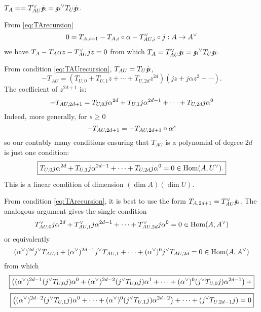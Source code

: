 { {\em $T_A = = T_{AU}^\vee \mathord{j\mkern-7mu\alpha} = \mathord{j\mkern-7mu\alpha}^\vee T_U \mathord{j\mkern-7mu\alpha}$.}

\bpf From \eqref{eq:TArecursion}
$$
0 = T_{A, i+1} - T_{A,i} \circ \alpha - T_{AU,i}^\vee \circ j : A \rightarrow A^\vee$$
we have
$T_A - T_A \alpha z - T_{AU}^\vee j z = 0$ from which $T_A = T_{AU}^\vee \mathord{j\mkern-7mu\alpha} = \mathord{j\mkern-7mu\alpha}^\vee T_U \mathord{j\mkern-7mu\alpha}$. \epf


From condition \eqref{eq:TAUrecursion}, $T_{AU} = T_U \mathord{j\mkern-7mu\alpha}$,
$$
-T_{AU} = \left( T_{U,0} + T_{U,1} z + \cdots + T_{U,2d} z^{2d} \right) \left( jz + j \alpha z ^2 + \cdots \right).$$
The coefficient of $z^{2d+1}$ is:
$$
-T_{AU,2d+1}=T_{U,0} j \alpha^{2d} + T_{U,1} j \alpha^{2d-1} + \cdots + T_{U,2d} j \alpha^0
$$
Indeed, more generally, for $s \geq 0$
$$
-T_{AU,2d+1}=-T_{AU,2d+1} \circ \alpha^s
$$
so our contably many conditions ensuring that $T_{AU}$ is a polynomial of degree $2d$ is just one condition:
\begin{equation}\label{eq:first}
\boxed{T_{U,0} j \alpha^{2d} + T_{U,1} j \alpha^{2d-1} + \cdots + T_{U,2d} j \alpha^0 = 0 \in \operatorname{Hom}(A, U^\vee).}
\end{equation}
This is a linear condition of dimension $(\dim A)(\dim U)$.




From condition \eqref{eq:TArecursion}, it is best to use the form $T_{A,2d+1} = T_{AU}^\vee \mathord{j\mkern-7mu\alpha}$.
The analogous argument gives the single condition
$$
T^\vee_{AU,0} j \alpha^{2d} + T^\vee_{AU,1} j \alpha^{2d-1} + \cdots + T^\vee_{AU,2d} j \alpha^0 = 0 \in \operatorname{Hom}(A, A^\vee)
$$
or equivalently 
$$
(\alpha^\vee)^{2d} j^\vee T_{AU,0}  + (\alpha^\vee)^{2d-1} j^\vee T_{AU,1} + \cdots + (\alpha^\vee)^0 j^\vee T_{AU,2d} = 0 \in \operatorname{Hom}(A, A^\vee)
$$
from which
\begin{equation}\label{eq:second}\boxed{
\left(   (\alpha^\vee)^{2d-1}  ( j^\vee T_{U,0} j)   \alpha^0 + 
  (\alpha^\vee)^{2d-2}  ( j^\vee T_{U,0} j)   \alpha^1 +  \cdots  +
  (\alpha^\vee)^{0}  ( j^\vee T_{U,0} j)   \alpha^{2d-1} \right) +  }\end{equation}
$$
\boxed{\left(   (\alpha^\vee)^{2d-2}  ( j^\vee T_{U,1} j)   \alpha^0 +   \cdots  +
    (\alpha^\vee)^{0}  ( j^\vee T_{U,1} j)   \alpha^{2d-2} \right) + \cdots + 
\left( j^\vee T_{U,2d-1} j \right) = 0}$$


}
